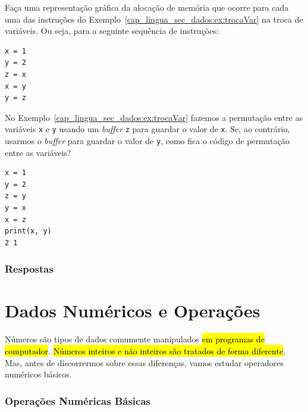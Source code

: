 \begin{exer}
  Faça uma representação gráfica da alocação de memória que ocorre para cada uma das instruções {\python} do Exemplo~\ref{cap_lingua_sec_dados:ex:trocaVar} na troca de variáveis. Ou seja, para a seguinte sequência de instruções:

\begin{lstlisting}
x = 1
y = 2
z = x
x = y
y = z
\end{lstlisting}

\end{exer}

\begin{exer}
  No Exemplo~\ref{cap_lingua_sec_dados:ex:trocaVar} fazemos a permutação entre as variáveis \lstinline+x+ e \lstinline+y+ usando um \textit{buffer} \lstinline+z+ para guardar o valor de \lstinline+x+. Se, ao contrário, usarmos o \textit{buffer} para guardar o valor de \lstinline+y+, como fica o código de permutação entre as variáveis?
\end{exer}
\begin{resp}

\begin{lstlisting}
x = 1
y = 2
z = y
y = x
x = z
print(x, y)
2 1
\end{lstlisting}

\end{resp}

\ifisbook
\subsubsection{Respostas}
\shipoutAnswer
\fi


\section{Dados Numéricos e Operações}\label{cap_lingua_sec_numop}

Números são tipos de dados comumente manipulados \hl{em programas de computador}. \hl{Números inteiros e não inteiros são tratados de forma diferente}. Mas, antes de discorrermos sobre essas diferenças, vamos estudar operadores numéricos básicos.

\subsubsection{Operações Numéricas Básicas}

